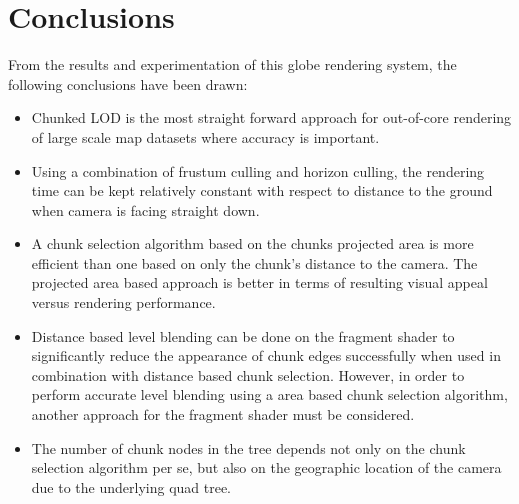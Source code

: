 \chapter{Conclusions}
From the results and experimentation of this globe rendering system, the following conclusions have been drawn:
\begin{itemize}
	\item Chunked LOD is the most straight forward approach for out-of-core rendering of large scale map datasets where accuracy is important.
	\item Using a combination of frustum culling and horizon culling, the rendering time can be kept relatively constant with respect to distance to the ground when camera is facing straight down.
	\item A chunk selection algorithm based on the chunks projected area is more efficient than one based on only the chunk's distance to the camera. The projected area based approach is better in terms of resulting visual appeal versus rendering performance.
	\item Distance based level blending can be done on the fragment shader to significantly reduce the appearance of chunk edges successfully when used in combination with distance based chunk selection. However, in order to perform accurate level blending using a area based chunk selection algorithm, another approach for the fragment shader must be considered.
	\item The number of chunk nodes in the tree depends not only on the chunk selection algorithm per se, but also on the geographic location of the camera due to the underlying quad tree.

\end{itemize}